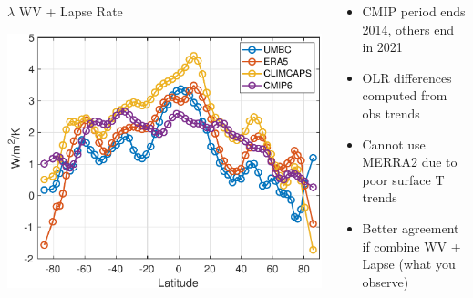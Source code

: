 \documentclass[10pt,t]{beamer}
\begin{document}
\begin{frame}
  \begin{columns}[T]
    \begin{column}{0.5\columnwidth}
      \vspace{-0.2in}
      \begin{block}{\footnotesize $\lambda$ WV + Lapse Rate}
        \vspace{-0.15in}
        \begin{center}
          \includegraphics[width=0.85\linewidth]{Figslls/wv_plus_lapse_lambda.pdf}
        \end{center}
      \end{block}
    \end{column}

    \begin{column}{0.5\columnwidth}
      \begin{footnotesize}
        \begin{itemize}
        \item CMIP period ends 2014, others end in 2021
        \item OLR differences computed from obs trends
        \item Cannot use MERRA2 due to poor surface T trends
        \item Better agreement if combine WV + Lapse (what you observe)
        \end{itemize}
      \end{footnotesize}
    \end{column}
  \end{columns}
\end{frame}
\end{document}
